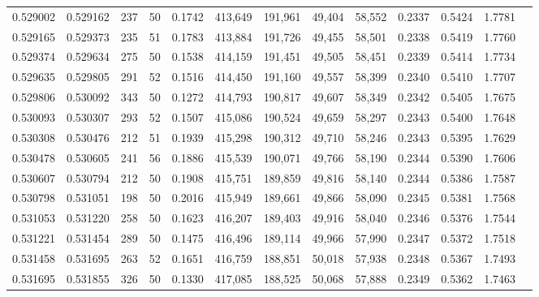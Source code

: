 \begin{tabular}{rrrrrrrrrrrrr}
0.529002 & 0.529162 &   237 &  50 &                                     0.1742 & 413,649 & 191,961 &  49,404 &  58,552 & 0.2337 & 0.5424 & 1.7781 \\
0.529165 & 0.529373 &   235 &  51 &                                     0.1783 & 413,884 & 191,726 &  49,455 &  58,501 & 0.2338 & 0.5419 & 1.7760 \\
0.529374 & 0.529634 &   275 &  50 &                                     0.1538 & 414,159 & 191,451 &  49,505 &  58,451 & 0.2339 & 0.5414 & 1.7734 \\
0.529635 & 0.529805 &   291 &  52 &                                     0.1516 & 414,450 & 191,160 &  49,557 &  58,399 & 0.2340 & 0.5410 & 1.7707 \\
0.529806 & 0.530092 &   343 &  50 &                                     0.1272 & 414,793 & 190,817 &  49,607 &  58,349 & 0.2342 & 0.5405 & 1.7675 \\
0.530093 & 0.530307 &   293 &  52 &                                     0.1507 & 415,086 & 190,524 &  49,659 &  58,297 & 0.2343 & 0.5400 & 1.7648 \\
0.530308 & 0.530476 &   212 &  51 &                                     0.1939 & 415,298 & 190,312 &  49,710 &  58,246 & 0.2343 & 0.5395 & 1.7629 \\
0.530478 & 0.530605 &   241 &  56 &                                     0.1886 & 415,539 & 190,071 &  49,766 &  58,190 & 0.2344 & 0.5390 & 1.7606 \\
0.530607 & 0.530794 &   212 &  50 &                                     0.1908 & 415,751 & 189,859 &  49,816 &  58,140 & 0.2344 & 0.5386 & 1.7587 \\
0.530798 & 0.531051 &   198 &  50 &                                     0.2016 & 415,949 & 189,661 &  49,866 &  58,090 & 0.2345 & 0.5381 & 1.7568 \\
0.531053 & 0.531220 &   258 &  50 &                                     0.1623 & 416,207 & 189,403 &  49,916 &  58,040 & 0.2346 & 0.5376 & 1.7544 \\
0.531221 & 0.531454 &   289 &  50 &                                     0.1475 & 416,496 & 189,114 &  49,966 &  57,990 & 0.2347 & 0.5372 & 1.7518 \\
0.531458 & 0.531695 &   263 &  52 &                                     0.1651 & 416,759 & 188,851 &  50,018 &  57,938 & 0.2348 & 0.5367 & 1.7493 \\
0.531695 & 0.531855 &   326 &  50 &                                     0.1330 & 417,085 & 188,525 &  50,068 &  57,888 & 0.2349 & 0.5362 & 1.7463 \\

\end{tabular}
